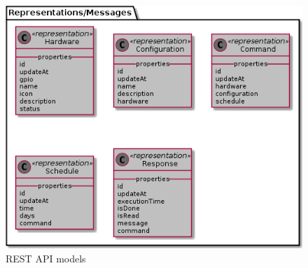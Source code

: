 \documentclass[12pt, oneside, a4paper]{book}
\begin{document}
			\begin{figure}[H]
				\caption{REST API models}
				\label{fig:rest_model}
				\includegraphics[width=\linewidth]{img/rest_uml_model.png}
			\end{figure}	
		\newpage
\end{document}
